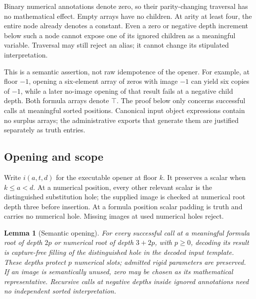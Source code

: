 \documentclass[11pt,letterpaper]{article}
\newtheorem{lemma}[theorem]{Lemma}
\theoremstyle{definition}
\theoremstyle{remark}
\begin{document}
Binary numerical annotations denote zero, so their parity-changing
traversal has no mathematical effect.  Empty arrays have no children.
At arity at least four, the entire node already denotes a constant.
Even a zero or negative depth increment below such a node cannot expose
one of its ignored children as a meaningful variable.  Traversal may
still reject an alias; it cannot change its stipulated interpretation.

This is a semantic assertion, not raw idempotence of the opener.
For example, at floor $-1$, opening a six-element array of zeros with
image $-1$ can yield six copies of $-1$, while a later no-image opening
of that result fails at a negative child depth.  Both formula arrays
denote $\top$.  The proof below only concerns successful calls at meaningful
sorted positions.  Canonical input object expressions contain no surplus
arrays; the administrative exports that generate them are justified
separately as truth entries.

\subsection{Opening and scope}
\label{subsec:opening-lemma}

Write $i(a,t,d)$ for the executable opener at floor $k$.  It preserves a
scalar when $k\leq a<d$.  At a numerical position, every other relevant
scalar is the distinguished substitution hole; the supplied image is
checked at numerical root depth three before insertion.  At a formula
position scalar padding is truth and carries no numerical hole.
Missing images at used numerical holes reject.

\begin{lemma}[Semantic opening]
\label{lem:semantic-opening}
For every successful call at a meaningful formula root of depth $2p$
or numerical root of depth $3+2p$, with $p\geq0$, decoding its result
is capture-free filling of the distinguished hole in the decoded input
template.  These depths protect $p$ numerical slots; admitted rigid
parameters are preserved.  If an image is semantically unused, zero
may be chosen as its mathematical representative.  Recursive calls
at negative depths inside ignored annotations need no independent
sorted interpretation.
\end{lemma}
\end{document}
